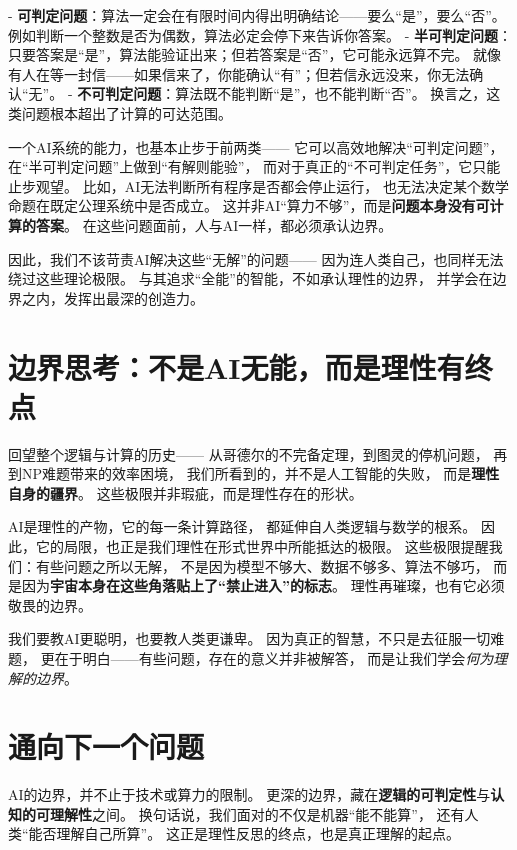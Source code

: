 - \textbf{可判定问题}：算法一定会在有限时间内得出明确结论——要么“是”，要么“否”。  
  例如判断一个整数是否为偶数，算法必定会停下来告诉你答案。  
- \textbf{半可判定问题}：只要答案是“是”，算法能验证出来；但若答案是“否”，它可能永远算不完。  
  就像有人在等一封信——如果信来了，你能确认“有”；但若信永远没来，你无法确认“无”。  
- \textbf{不可判定问题}：算法既不能判断“是”，也不能判断“否”。  
  换言之，这类问题根本超出了计算的可达范围。

一个AI系统的能力，也基本止步于前两类——  
它可以高效地解决“可判定问题”，  
在“半可判定问题”上做到“有解则能验”，  
而对于真正的“不可判定任务”，它只能止步观望。  
比如，AI无法判断所有程序是否都会停止运行，  
也无法决定某个数学命题在既定公理系统中是否成立。  
这并非AI“算力不够”，而是\textbf{问题本身没有可计算的答案}。  
在这些问题面前，人与AI一样，都必须承认边界。

因此，我们不该苛责AI解决这些“无解”的问题——  
因为连人类自己，也同样无法绕过这些理论极限。  
与其追求“全能”的智能，不如承认理性的边界，  
并学会在边界之内，发挥出最深的创造力。

\section*{边界思考：不是AI无能，而是理性有终点}

回望整个逻辑与计算的历史——  
从哥德尔的不完备定理，到图灵的停机问题，  
再到NP难题带来的效率困境，  
我们所看到的，并不是人工智能的失败，  
而是\textbf{理性自身的疆界}。  
这些极限并非瑕疵，而是理性存在的形状。

AI是理性的产物，它的每一条计算路径，  
都延伸自人类逻辑与数学的根系。  
因此，它的局限，也正是我们理性在形式世界中所能抵达的极限。  
这些极限提醒我们：有些问题之所以无解，  
不是因为模型不够大、数据不够多、算法不够巧，  
而是因为\textbf{宇宙本身在这些角落贴上了“禁止进入”的标志}。  
理性再璀璨，也有它必须敬畏的边界。

我们要教AI更聪明，也要教人类更谦卑。  
因为真正的智慧，不只是去征服一切难题，  
更在于明白——有些问题，存在的意义并非被解答，  
而是让我们学会\textit{何为理解的边界}。

\section*{通向下一个问题}

AI的边界，并不止于技术或算力的限制。  
更深的边界，藏在\textbf{逻辑的可判定性}与\textbf{认知的可理解性}之间。  
换句话说，我们面对的不仅是机器“能不能算”，  
还有人类“能否理解自己所算”。  
这正是理性反思的终点，也是真正理解的起点。

